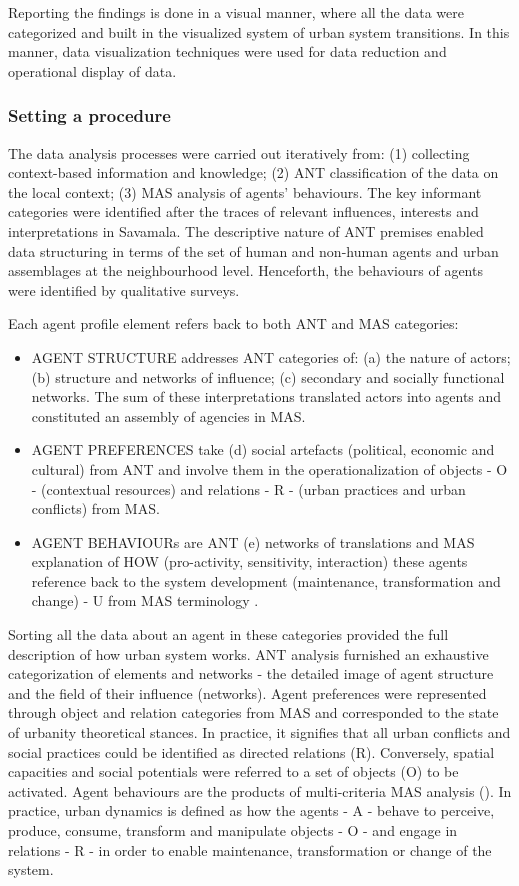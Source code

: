 \documentclass[11pt]{report}
\begin{document}
Reporting the findings is done in a visual manner, where all the data were categorized and built in the visualized system of urban system transitions. In this manner, data visualization techniques were used for data reduction and operational display of data.

\subsubsection{Setting a procedure}

The data analysis processes were carried out iteratively from: (1) collecting context-based information and knowledge; (2) ANT classification of the data on the local context; (3) MAS analysis of agents’ behaviours.
The key informant categories were identified after the traces of relevant influences, interests and interpretations in Savamala.
The descriptive nature of ANT premises enabled data structuring in terms of the set of human and non-human agents and urban assemblages at the neighbourhood level. Henceforth, the behaviours of agents were identified by qualitative surveys.

Each agent profile element refers back to both ANT and MAS categories:
\begin{itemize}
\item AGENT STRUCTURE addresses ANT categories of: (a) the nature of actors; (b) structure and networks of influence; (c) secondary and socially functional networks. The sum of these interpretations translated actors into agents and constituted an assembly of agencies  in MAS. 
\item AGENT PREFERENCES take (d) social artefacts (political, economic and cultural) from ANT and involve them in the operationalization of objects - O - (contextual resources) and relations - R - (urban practices and urban conflicts) from MAS.
\item AGENT BEHAVIOURs are ANT (e) networks of translations and MAS explanation of HOW (pro-activity, sensitivity, interaction) these agents reference back to the system development (maintenance, transformation and change) - U from MAS terminology .
\end{itemize}

Sorting all the data about an agent in these categories provided the full description of how urban system works. ANT analysis furnished an exhaustive categorization of elements and networks - the detailed image of agent structure and the field of their influence (networks). Agent preferences were represented through object and relation categories from MAS and corresponded to the state of urbanity theoretical stances. In practice, it signifies that all urban conflicts and social practices could be identified as directed relations (R). Conversely, spatial capacities and social potentials were referred to a set of objects (O) to be activated. Agent behaviours are the products of multi-criteria MAS analysis (\cite{Arsanjani et al. 2013}). In practice, urban dynamics is defined as how the agents - A - behave to perceive, produce, consume, transform and manipulate objects - O - and engage in relations - R - in order to enable maintenance, transformation or change of the system.
\end{document}
